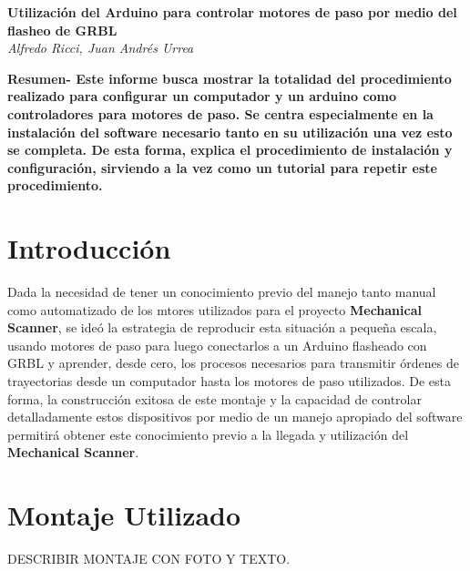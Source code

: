 \documentclass{article}
\begin{document}
\begin{center}
{\Large \textbf{Utilización del Arduino para controlar motores de paso por medio del flasheo de GRBL}}\\
\vspace{0.3cm}
\textit{Alfredo Ricci, Juan Andrés Urrea}
\end{center}
\begin{multicols}{2}
\textbf{Resumen- Este informe busca mostrar la totalidad del procedimiento realizado para configurar un computador y un arduino como controladores para motores de paso. Se centra especialmente en la instalación del software necesario tanto en su utilización una vez esto se completa. De esta forma, explica el procedimiento de instalación y configuración, sirviendo a la vez como un tutorial para repetir este procedimiento.}

{\centering \section{Introducción}}
Dada la necesidad de tener un conocimiento previo del manejo tanto manual como automatizado de los mtores utilizados para el proyecto \textbf{Mechanical Scanner}, se ideó la estrategia de reproducir esta situación a pequeña escala, usando motores de paso para luego conectarlos a un Arduino flasheado con GRBL y aprender, desde cero, los procesos necesarios para transmitir órdenes de trayectorias desde un computador hasta los motores de paso utilizados. De esta forma, la construcción exitosa de este montaje y la capacidad de controlar detalladamente estos dispositivos por medio de un manejo apropiado del software permitirá obtener este conocimiento previo a la llegada y utilización del \textbf{Mechanical Scanner}.

{\centering \section{Montaje Utilizado}}
DESCRIBIR MONTAJE CON FOTO Y TEXTO.


\end{multicols}
\end{document}
